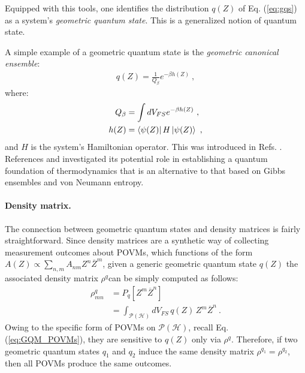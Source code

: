 \documentclass[draft,nofootinbib,pre,twocolumn,showpacs,showkeys,preprintnumbers,floatfix]{revtex4-1}
\newcommand{\1}{\mathbbm{1}}
\newcommand{\intP}{\int_{\mathcal{P}(\mathcal{H})} \!\!\!\!\!\!\!\!\!}
\begin{document}
Equipped with this tools, one identifies the distribution $q(Z)$ of Eq.
(\ref{eq:gqs}) as a system's \emph{geometric quantum state}. This is a
generalized notion of quantum state.

A simple example of a geometric quantum state is the 
\emph{geometric canonical ensemble}:
\begin{align*}
q(Z) = \frac{1}{Q_\beta} e^{-\beta h(Z)}
  ~,
\end{align*}
where:
\begin{align*}
  Q_\beta & = \int dV_{FS} e^{-\beta h(Z)} ~, \\
  h(Z) & = \bra{\psi(Z)}H\ket{\psi(Z)} ~,
\end{align*}
and $H$ is the system's Hamiltonian operator. This was introduced in 
Refs. \cite{Brody1998}. References \cite{Brody2016} and \cite{Anza20b} 
investigated its potential role in establishing a quantum foundation of
thermodynamics that is an alternative to that based on Gibbs ensembles and von
Neumann entropy. 

\paragraph*{Density matrix.}
The connection between geometric quantum states and density matrices is
fairly straightforward. Since density matrices are a synthetic way of collecting
measurement outcomes about POVMs, which functions of the 
form $A(Z) \propto \sum_{n,m}A_{n m} Z^n \overline{Z}^m$, 
given a generic geometric quantum state $q(Z)$ the associated density matrix $\rho^q$can be 
simply computed as follows:
\begin{align}
\rho^q_{mn} & = P_q[Z^m \overline{Z}^n] \nonumber \\
  & = \intP dV_{FS} \, q(Z)  \, Z^m \overline{Z}^n
  ~.
\label{eq:densitymatrix}
\end{align}
Owing to the specific form of POVMs on $\mathcal{P}(\mathcal{H})$, recall Eq. (\ref{eq:GQM_POVMs}), they
are sensitive to $q(Z)$ only via $\rho^q$. Therefore, if two geometric quantum states 
$q_1$ and $q_2$ induce the same density matrix $\rho^{q_1} = \rho^{q_2}$, then all POVMs
produce the same outcomes.
\end{document}
